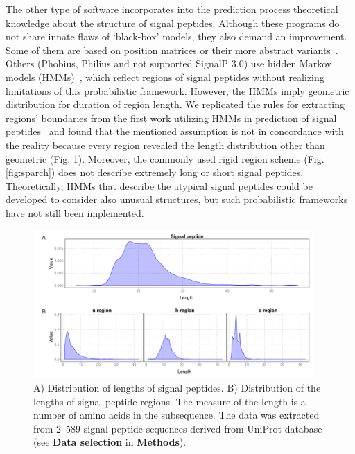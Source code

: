 \documentclass[fleqn,10pt,twoside]{gcb15submission}
\begin{document}
The other type of software incorporates into the prediction process theoretical knowledge about the structure of signal peptides. Although these programs do not share innate flaws of ‘black-box’ models, they also demand an improvement. Some of them are based on position matrices or their more abstract variants~\citep{2014zhangprediction, 2004hillerpredisi}. Others (Phobius, Philius and not supported SignalP 3.0) use hidden Markov models (HMMs)~\citep{2004klla, 2008reynoldstransmembrane, 2004bendtsenimproved}, which reflect regions of signal peptides without realizing limitations of this probabilistic framework. However, the HMMs imply geometric distribution for duration of region length. We replicated the rules for extracting regions' boundaries from the first work utilizing HMMs in prediction of signal peptides~\citep{1998nielsenprediction} and found that the mentioned assumption is not in concordance with the reality because every region revealed the length distribution other than geometric (Fig. \ref{fig:reglen}). Moreover, the commonly used rigid region scheme (Fig. \ref{fig:sparch}) does not describe extremely long or short signal peptides. Theoretically, HMMs that describe the atypical signal peptides could be developed to consider also unusual structures, but such probabilistic frameworks have not still been implemented.

\begin{figure}[ht]\centering
\includegraphics[width=0.95\textwidth]{figures/reglen.png}
\caption{A) Distribution of lengths of signal peptides. B) Distribution of the lengths of signal peptide regions. The measure of the length is a number of amino acids in the subsequence. The data was extracted from 2~589 signal peptide sequences derived from UniProt database (see \textbf{Data selection} in \textbf{Methods}).}
\label{fig:reglen}
\end{figure}
\end{document}
